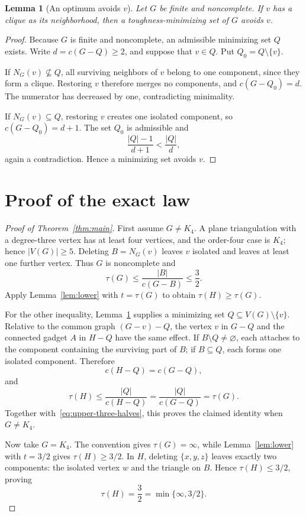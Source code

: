 \documentclass[11pt]{article}
\newtheorem{lemma}[theorem]{Lemma}
\newcommand{\comp}{c}
\newcommand{\tough}{\tau}
\begin{document}
\begin{lemma}[An optimum avoids \(v\)]\label{lem:avoid}
Let \(G\) be finite and noncomplete.  If \(v\) has a clique as its
neighborhood, then a toughness-minimizing set of \(G\) avoids \(v\).
\end{lemma}

\begin{proof}
Because \(G\) is finite and noncomplete, an admissible minimizing set \(Q\)
exists.  Write \(d=\comp(G-Q)\ge2\), and suppose that \(v\in Q\).  Put
\(Q_0=Q\setminus\{v\}\).

If \(N_G(v)\nsubseteq Q\), all surviving neighbors of \(v\) belong to one
component, since they form a clique.  Restoring \(v\) therefore merges no
components, and \(\comp(G-Q_0)=d\).  The numerator has decreased by one,
contradicting minimality.

If \(N_G(v)\subseteq Q\), restoring \(v\) creates one isolated component,
so \(\comp(G-Q_0)=d+1\).  The set \(Q_0\) is admissible and
\[
  \frac{|Q|-1}{d+1}<\frac{|Q|}{d},
\]
again a contradiction.  Hence a minimizing set avoids \(v\).
\end{proof}

\section{Proof of the exact law}

\begin{proof}[Proof of Theorem~\ref{thm:main}]
First assume \(G\ne K_4\).  A plane triangulation with a degree-three vertex
has at least four vertices, and the order-four case is \(K_4\); hence
\(|V(G)|\ge5\).  Deleting \(B=N_G(v)\) leaves \(v\) isolated and leaves at
least one further vertex.  Thus \(G\) is noncomplete and
\begin{equation}\label{eq:upper-three-halves}
  \tough(G)\le \frac{|B|}{\comp(G-B)}\le\frac32.
\end{equation}
Apply Lemma~\ref{lem:lower} with \(t=\tough(G)\) to obtain
\(\tough(H)\ge\tough(G)\).

For the other inequality, Lemma~\ref{lem:avoid} supplies a minimizing set
\(Q\subseteq V(G)\setminus\{v\}\).  Relative to the common graph
\((G-v)-Q\), the vertex \(v\) in \(G-Q\) and the connected gadget \(A\) in
\(H-Q\) have the same effect.  If \(B\setminus Q\ne\varnothing\), each
attaches to the component containing the surviving part of \(B\); if
\(B\subseteq Q\), each forms one isolated component.  Therefore
\[
  \comp(H-Q)=\comp(G-Q),
\]
and
\[
  \tough(H)\le\frac{|Q|}{\comp(H-Q)}
  =\frac{|Q|}{\comp(G-Q)}=\tough(G).
\]
Together with~\eqref{eq:upper-three-halves}, this proves the claimed identity
when \(G\ne K_4\).

Now take \(G=K_4\).  The convention gives \(\tough(G)=\infty\), while
Lemma~\ref{lem:lower} with \(t=3/2\) gives \(\tough(H)\ge3/2\).  In \(H\),
deleting \(\{x,y,z\}\) leaves exactly two components: the isolated vertex
\(w\) and the triangle on \(B\).  Hence \(\tough(H)\le3/2\), proving
\[
  \tough(H)=\frac32=\min\{\infty,3/2\}.
\]
\end{proof}
\end{document}
